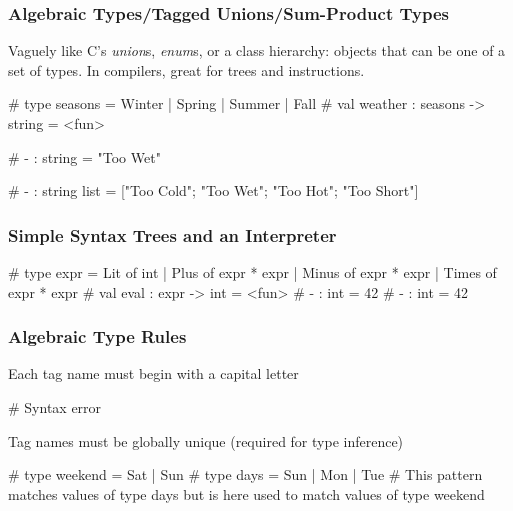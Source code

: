 \documentclass{plt}
\begin{document}
\begin{frame}[fragile]
  \frametitle{Algebraic Types/Tagged Unions/Sum-Product Types}

Vaguely like C's \emph{union}s, \emph{enum}s, or a class hierarchy:
objects that can be one of a set of types.  In compilers, great for
trees and instructions.

\begin{interactive}
# 
type seasons = Winter | Spring | Summer | Fall
# 
val weather : seasons -> string = <fun>

# 
- : string = "Too Wet"

# 
- : string list = ["Too Cold"; "Too Wet"; "Too Hot"; "Too Short"]
\end{interactive}

\end{frame}

\begin{frame}[fragile]
  \frametitle{Simple Syntax Trees and an Interpreter}

\begin{interactive}
# 
type expr =
    Lit of int
  | Plus of expr * expr
  | Minus of expr * expr
  | Times of expr * expr
# 
val eval : expr -> int = <fun>
# 
- : int = 42
# 
- : int = 42
\end{interactive}
\end{frame}

\begin{frame}[fragile]
  \frametitle{Algebraic Type Rules}

Each tag name must begin with a capital letter

\medskip

\begin{interactive}
# 
Syntax error
\end{interactive}

\medskip

Tag names must be globally unique (required for type inference)

\medskip

\begin{interactive}
# 
type weekend = Sat | Sun
# 
type days = Sun | Mon | Tue
# 
This pattern matches values of type days
but is here used to match values of type weekend
\end{interactive}

\end{frame}
\end{document}
